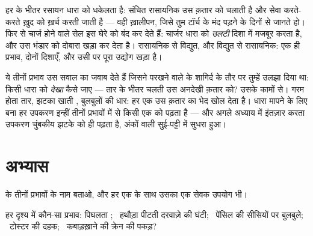 \begin{example}\label{ex:g8:electric-current-effects:battery}
हर  के भीतर रसायन धारा को धकेलता है: संचित रासायनिक  उस
क़तार को चलाती है और सेवा करते-करते ख़ुद को ख़र्च करती जाती है --- वही
ख़ालीपन, जिसे तुम टॉर्च के मंद पड़ने के दिनों से जानते हो। फिर से
चार्ज होने वाले सेल इस घेरे को बंद कर देते हैं: चार्जर धारा को
\emph{उलटी} दिशा में मजबूर करता है, और  उस भंडार को
दोबारा खड़ा कर देता है। रासायनिक से विद्युत, और विद्युत से रासायनिक:
एक ही प्रभाव, दोनों दिशाएँ, और उसी पर पूरा  उद्योग खड़ा है।
\end{example}

\begin{remark}[प्रभाव, संसूचक के तौर पर]\label{rem:g8:electric-current-effects:detect}
ये तीनों प्रभाव उस सवाल का जवाब देते हैं जिसने परखने वाले के
शागिर्द के तौर पर तुम्हें उलझा दिया था: किसी धारा को \emph{देखा} कैसे
जाए ---  तार के भीतर चलती उस अनदेखी क़तार को? उसके कामों से।
गरम होता तार, झटका खाती , बुलबुलों की धार: हर एक उस क़तार का
भेद खोल देता है। धारा मापने के लिए बना हर उपकरण इन्हीं तीनों प्रभावों
में से किसी एक को पढ़ता है --- और अगले अध्याय में इंतज़ार करता उपकरण
चुंबकीय झटके को ही पढ़ता है, अंकों वाली सुई-पट्टी में सुधरा हुआ।
\end{remark}

\section{अभ्यास}

\begin{exercise}[$\star$]\label{exo:g8:electric-current-effects:1}
 के तीनों प्रभावों के नाम बताओ, और हर एक के साथ उसका एक
सेवक उपयोग भी।
\end{exercise}

\begin{exercise}[$\star$]\label{exo:g8:electric-current-effects:2}
हर दृश्य में कौन-सा प्रभाव: पिघलता ; \ हथौड़ा पीटती दरवाज़े की
घंटी; \ पेंसिल की सीसियों पर बुलबुले; \ टोस्टर की दहक; \ कबाड़ख़ाने की
क्रेन की पकड़?
\end{exercise}

